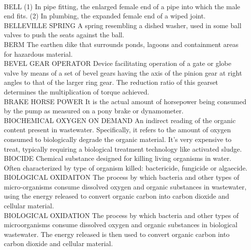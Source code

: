 \documentclass{article}
\begin{document}
\vspace{0.3cm}\\
BELL
(1) In pipe fitting, the enlarged female end of a pipe into which the male end fits. (2) In plumbing, the expanded female end of a wiped joint. 
\vspace{0.3cm}\\
BELLEVILLE SPRING
A spring resembling a dished washer, used in some ball valves to push the seats against the ball.
\vspace{0.3cm}\\
BERM
The earthen dike that surrounds ponds, lagoons and containment areas for hazardous material.
\vspace{0.3cm}\\
BEVEL GEAR OPERATOR
Device facilitating operation of a gate or globe valve by means of a set of bevel gears having the axis of the pinion gear at right angles to that of the larger ring gear. The reduction ratio of this gearset determines the multiplication of torque achieved.
\vspace{0.3cm}\\
BRAKE HORSE POWER
It is the actual amount of horsepower being consumed by the pump as measured on a pony brake or dynamometer.
\vspace{0.3cm}\\
BIOCHEMICAL OXYGEN ON DEMAND
An indirect reading of the organic content present in wastewater. Specifically, it refers to the amount of oxygen consumed to biologically degrade the organic material. It’s very expensive to treat, typically requiring a biological treatment technology like activated sludge.
\vspace{0.3cm}\\
BIOCIDE
Chemical substance designed for killing living organisms in water. Often characterized by type of organism killed: bactericide, fungicide or algaecide.
\vspace{0.3cm}\\
BIOLOGICAL OXIDAITON
The process by which bacteria and other types of micro-organisms consume dissolved oxygen and organic substances in wastewater, using the energy released to convert organic carbon into carbon dioxide and cellular material.
\vspace{0.3cm}\\
BIOLOGICAL OXIDATION
The process by which bacteria and other types of microorganisms consume dissolved oxygen and organic substances in biological wastewater.  The energy released is then used to convert organic carbon into carbon dioxide and cellular material. 
\end{document}
